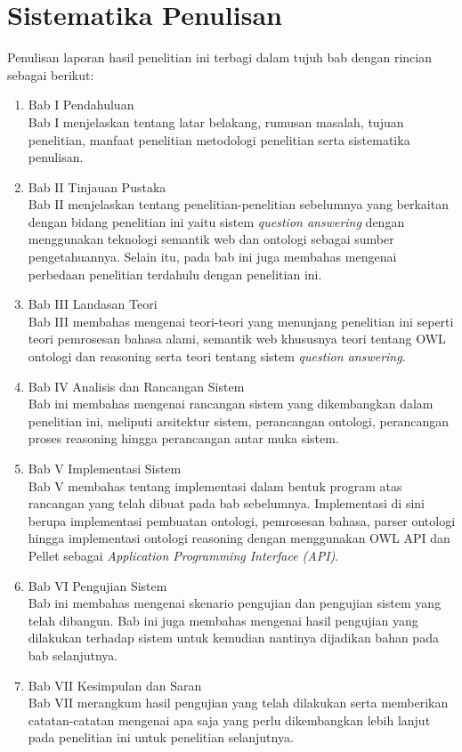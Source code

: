 \section{Sistematika Penulisan}
Penulisan laporan hasil penelitian ini terbagi dalam tujuh bab dengan rincian sebagai berikut:
\begin{enumerate}
	\item Bab I Pendahuluan\\
	Bab I menjelaskan tentang latar belakang, rumusan masalah, tujuan penelitian, manfaat penelitian metodologi penelitian serta sistematika penulisan.
	\item Bab II Tinjauan Pustaka\\
	Bab II menjelaskan tentang penelitian-penelitian sebelumnya yang berkaitan dengan bidang penelitian ini yaitu sistem \emph{question answering} dengan menggunakan teknologi semantik web dan ontologi sebagai sumber pengetahuannya. Selain itu, pada bab ini juga membahas mengenai perbedaan penelitian terdahulu dengan penelitian ini.
	\item Bab III Landasan Teori\\
	Bab III membahas mengenai teori-teori yang menunjang penelitian ini seperti teori pemrosesan bahasa alami, semantik web khususnya teori tentang OWL ontologi dan reasoning serta teori tentang sistem \emph{question answering}.
	\item Bab IV Analisis dan Rancangan Sistem\\
	Bab ini membahas mengenai rancangan sistem yang dikembangkan dalam penelitian ini, meliputi arsitektur sistem, perancangan ontologi, perancangan proses reasoning hingga perancangan antar muka sistem.
	\item Bab V Implementasi Sistem\\
	Bab V membahas tentang implementasi dalam bentuk program atas rancangan yang telah dibuat pada bab sebelumnya. Implementasi di sini berupa implementasi pembuatan ontologi, pemrosesan bahasa, parser ontologi hingga implementasi ontologi reasoning dengan menggunakan OWL API dan Pellet sebagai \emph{Application Programming Interface (API)}.
	\item Bab VI Pengujian Sistem\\
	Bab ini membahas mengenai skenario pengujian dan pengujian sistem yang telah dibangun. Bab ini juga membahas mengenai hasil pengujian yang dilakukan terhadap sistem untuk kemudian nantinya dijadikan bahan pada bab selanjutnya.
	\item Bab VII Kesimpulan dan Saran\\
	Bab VII merangkum hasil pengujian yang telah dilakukan serta memberikan catatan-catatan mengenai apa saja yang perlu dikembangkan lebih lanjut pada penelitian ini untuk penelitian selanjutnya.
\end{enumerate}